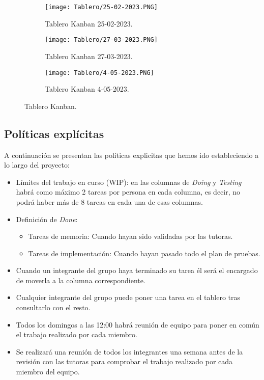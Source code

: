 \begin{figure}[ht!]
  \centering
  \begin{subfigure}{\textwidth}
    \centering
    \texttt{[image: Tablero/25-02-2023.PNG]}
    \caption{Tablero Kanban 25-02-2023.}
    \label{fig:tabFeb}
  \end{subfigure}

  \begin{subfigure}{\textwidth}
    \centering
    \texttt{[image: Tablero/27-03-2023.PNG]}
    \caption{Tablero Kanban 27-03-2023.}
    \label{fig:tabmarzo}
  \end{subfigure}

  \begin{subfigure}{\textwidth}
    \centering
    \texttt{[image: Tablero/4-05-2023.PNG]}
    \caption{Tablero Kanban 4-05-2023.}
    \label{fig:tabmayo}
  \end{subfigure}

  \caption{Tablero Kanban.}
  \label{fig:taleros}
\end{figure}

\subsection{Políticas explícitas}
\label{sec:politicas}
A continuación se presentan las políticas explicitas que hemos ido estableciendo a lo largo del proyecto:

\begin{itemize}
  \item Límites del trabajo en curso (WIP): en las columnas de \textit{Doing} y \textit{Testing} habrá como máximo 2 tareas por persona en cada columna, es decir, no podrá haber más de 8 tareas en cada una de esas columnas.
  \item Definición de \textit{Done}:
        \begin{itemize}
          \item Tareas de memoria: Cuando hayan sido validadas por las tutoras.
          \item Tareas de implementación: Cuando hayan pasado todo el plan de pruebas.
        \end{itemize}
  \item Cuando un integrante del grupo haya terminado su tarea él será el encargado de moverla a la columna correspondiente.
  \item Cualquier integrante del grupo puede poner una tarea en el tablero tras consultarlo con el resto.
  \item Todos los domingos a las 12:00 habrá reunión de equipo para poner en común el trabajo realizado por cada miembro.
  \item Se realizará una reunión de todos los integrantes una semana antes de la revisión con las tutoras para comprobar el trabajo realizado por cada miembro del equipo.
\end{itemize}

